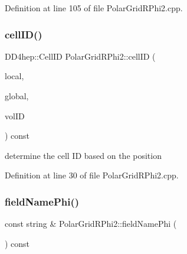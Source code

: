 Definition at line 105 of file Polar\+Grid\+R\+Phi2.\+cpp.

\hypertarget{class_d_d4hep_1_1_geometry_1_1_polar_grid_r_phi2_ad259f199ef0f54e752c28b436a7ee510}{}\label{class_d_d4hep_1_1_geometry_1_1_polar_grid_r_phi2_ad259f199ef0f54e752c28b436a7ee510} 
\subsubsection{\texorpdfstring{cell\+I\+D()}{cellID()}}
{\footnotesize\ttfamily D\+D4hep\+::\+Cell\+ID Polar\+Grid\+R\+Phi2\+::cell\+ID (\begin{DoxyParamCaption}\item[{const \hyperlink{namespace_d_d4hep_1_1_geometry_a55083902099d03506c6db01b80404900}{Position} \&}]{local,  }\item[{const \hyperlink{namespace_d_d4hep_1_1_geometry_a55083902099d03506c6db01b80404900}{Position} \&}]{global,  }\item[{const Volume\+ID \&}]{vol\+ID }\end{DoxyParamCaption}) const}



determine the cell ID based on the position 



Definition at line 30 of file Polar\+Grid\+R\+Phi2.\+cpp.

\hypertarget{class_d_d4hep_1_1_geometry_1_1_polar_grid_r_phi2_a43f81a04d3efecec514a5aae99515bf5}{}\label{class_d_d4hep_1_1_geometry_1_1_polar_grid_r_phi2_a43f81a04d3efecec514a5aae99515bf5} 
\subsubsection{\texorpdfstring{field\+Name\+Phi()}{fieldNamePhi()}}
{\footnotesize\ttfamily const string \& Polar\+Grid\+R\+Phi2\+::field\+Name\+Phi (\begin{DoxyParamCaption}{ }\end{DoxyParamCaption}) const}



